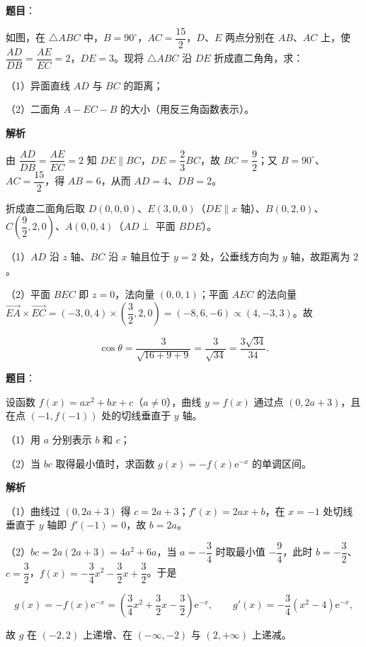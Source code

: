 \begin{answer}

\textbf{题目}：

如图，在 $\triangle ABC$ 中，$B=90^\circ$，$AC=\dfrac{15}2$，$D$、$E$ 两点分别在 $AB$、$AC$ 上，使 $\dfrac{AD}{DB}=\dfrac{AE}{EC}=2$，$DE=3$。现将 $\triangle ABC$ 沿 $DE$ 折成直二角角，求：

（1）异面直线 $AD$ 与 $BC$ 的距离；

（2）二面角 $A-EC-B$ 的大小（用反三角函数表示）。
\nopagebreak[4]
\begin{center}\end{center}
\nopagebreak[4]
\textbf{解析}

由 $\dfrac{AD}{DB}=\dfrac{AE}{EC}=2$ 知 $DE\parallel BC$，$DE=\dfrac23BC$，故 $BC=\dfrac92$；又 $B=90^\circ$、$AC=\dfrac{15}2$，得 $AB=6$，从而 $AD=4$、$DB=2$。

折成直二面角后取 $D(0,0,0)$、$E(3,0,0)$（$DE\parallel x$ 轴）、$B(0,2,0)$、$C\left(\dfrac92,2,0\right)$、$A(0,0,4)$（$AD\perp$ 平面 $BDE$）。

（1）$AD$ 沿 $z$ 轴、$BC$ 沿 $x$ 轴且位于 $y=2$ 处，公垂线方向为 $y$ 轴，故距离为 $2$。

（2）平面 $BEC$ 即 $z=0$，法向量 $(0,0,1)$；平面 $AEC$ 的法向量 $\overrightarrow{EA}\times\overrightarrow{EC}=(-3,0,4)\times\left(\dfrac32,2,0\right)=(-8,6,-6)\propto(4,-3,3)$。故

\nopagebreak[4]
\[\cos\theta=\frac3{\sqrt{16+9+9}}=\frac3{\sqrt{34}}=\frac{3\sqrt{34}}{34}.\]


\end{answer}
\begin{answer}

\textbf{题目}：

设函数 $f(x)=ax^2+bx+c$（$a\neq0$），曲线 $y=f(x)$ 通过点 $(0,2a+3)$，且在点 $(-1,f(-1))$ 处的切线垂直于 $y$ 轴。

（1）用 $a$ 分别表示 $b$ 和 $c$；

（2）当 $bc$ 取得最小值时，求函数 $g(x)=-f(x)\mathrm e^{-x}$ 的单调区间。

\textbf{解析}

（1）曲线过 $(0,2a+3)$ 得 $c=2a+3$；$f'(x)=2ax+b$，在 $x=-1$ 处切线垂直于 $y$ 轴即 $f'(-1)=0$，故 $b=2a$。

（2）$bc=2a(2a+3)=4a^2+6a$，当 $a=-\dfrac34$ 时取最小值 $-\dfrac94$，此时 $b=-\dfrac32$、$c=\dfrac32$，$f(x)=-\dfrac34x^2-\dfrac32x+\dfrac32$。于是

\nopagebreak[4]
\[g(x)=-f(x)\mathrm e^{-x}=\left(\frac34x^2+\frac32x-\frac32\right)\mathrm e^{-x},\qquad g'(x)=-\frac34(x^2-4)\mathrm e^{-x},\]

故 $g$ 在 $(-2,2)$ 上递增、在 $(-\infty,-2)$ 与 $(2,+\infty)$ 上递减。


\end{answer}
